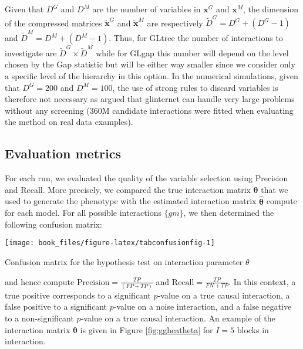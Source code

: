 \documentclass[]{book}
\begin{document}
Given that \(D^{\mathit{G}}\) and \(D^{\mathit{M}}\) are the number of variables in
\(\mathbf{x}^{\mathit{G}}\) and \(\mathbf{x}^{\mathit{M}}\), the dimension of the compressed matrices
\(\tilde{\mathbf{x}}^{\mathit{G}}\) and \(\tilde{\mathbf{x}}^{\mathit{M}}\) are respectively
\(\tilde{D}^{\mathit{G}} = D^{\mathit{G}} + (D^{\mathit{G}}-1)\) and
\(\tilde{D}^{\mathit{M}} = D^{\mathit{M}} + (D^{\mathit{M}}-1)\). Thus, for GLtree the number
of interactions to investigate are
\(\tilde{D}^{\mathit{G}} \times \tilde{D}^{\mathit{M}}\) while for GLgap this number
will depend on the level chosen by the Gap statistic but will be either
way smaller since we consider only a specific level of the hierarchy in
this option. In the numerical simulations, given that \(D^{\mathit{G}} = 200\)
and \(D^{\mathit{M}}=100\), the use of strong rules to discard variables is
therefore not necessary as \citep{lim2015learning} argued that glinternet can
handle very large problems without any screening (360M candidate
interactions were fitted when evaluating the method on real data
examples).

\hypertarget{evaluation-metrics}{%
\subsection{Evaluation metrics}\label{evaluation-metrics}}

For each run, we evaluated the quality of the variable selection using
Precision and Recall. More precisely, we compared the true interaction
matrix \(\boldsymbol{\theta}\) that we used to generate the phenotype with the
estimated interaction matrix \(\hat{\boldsymbol{\theta}}\) compute for each model. For
all possible interactions \(\{gm\}\), we then determined the
following confusion matrix:

\begin{center}\texttt{[image: book\_files/figure-latex/tabconfusionfig-1]} \end{center}

\label{tab:tabconfusion}Confusion matrix for the hypothesis test on interaction parameter \(\theta\)

and hence compute \(\text{Precision}={\frac{TP}{(FP+TP)}}\) and
\(\text{Recall}=\frac{TP}{FN+TP}\). In this context, a true positive
corresponds to a significant \(p\)-value on a true causal interaction, a
false positive to a significant \(p\)-value on a noise interaction, and a
false negative to a non-significant \(p\)-value on a true causal
interaction. An example of the interaction matrix \(\boldsymbol{\theta}\) is
given in Figure \ref{fig:ggheatheta} for \(I=5\) blocks in interaction.
\end{document}
